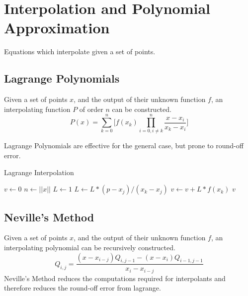 \documentclass[12pt]{article}
\numberwithin{equation}{subsection}
\begin{document}
    \section{Interpolation and Polynomial Approximation}

        Equations which interpolate given a set of points.

        \subsection{Lagrange Polynomials}

            Given a set of points $x$, and the output of their unknown function
            $f$, an interpolating function $P$ of order $n$ can be constructed.
            $$P(x) = \sum_{k=0}^n \Big[ f(x_k) \prod _{i=0, i\neq k}^n \frac{x - x_{i}}{x_{k} - x_{i}} \Big]$$

            Lagrange Polynomials are effective for the general case, but prone
            to round-off error.

            \begin{center}
            \begin{algorithm}[H]
                \caption{Lagrange Interpolation}
                \begin{algorithmic}[1]
                    \State $v \gets 0$
                    \State $n \gets ||x||$
                        \State $L \gets 1$
                                \State $L \gets L * (p - x_j) / (x_k - x_j)$
                            \EndIf
                        \EndFor
                        \State $v \gets v + L * f(x_k)$
                    \EndFor
                    \State \Return $v$
                    \EndProcedure
                \end{algorithmic}
            \end{algorithm}
            \end{center}

        \subsection{Neville's Method}

            Given a set of points $x$, and the output of their unknown function
            $f$, an interpolating polynomial can be recursively constructed.
            $$Q_{i,j} = \frac{(x - x_{i-j})Q_{i,j-1} - (x - x_i)Q_{i-1,j-1}}{x_i - x_{i-j}}$$
            Neville's Method reduces the computations required for interpolants
            and therefore reduces the round-off error from lagrange.
\end{document}
